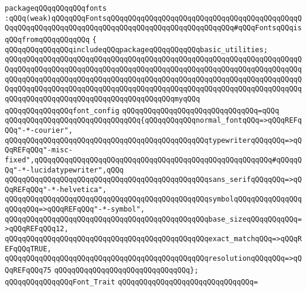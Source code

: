 \newline
\newline
\newline
\verb|packageqQQqqQQqqQQqfonts|\newline
\verb|:qQQq(weak)qQQqqQQqFontsqQQqqQQqqQQqqQQqqQQqqQQqqQQqqQQqqQQqqQQqqQQqqQQqqQQqqQQqqQQqqQQqqQQqqQQqqQQqqQQqqQQqqQQqqQQqqQQqqQQq#qQQqFontsqQQqisqQQqfromqQQqqQQqqQQq|\newline
\verb|{|\newline
\verb|qQQqqQQqqQQqqQQqincludeqQQqpackageqQQqqQQqqQQqbasic_utilities;|\newline
\verb|qQQqqQQqqQQqqQQqqQQqqQQqqQQqqQQqqQQqqQQqqQQqqQQqqQQqqQQqqQQqqQQqqQQqqQQqqQQqqQQqqQQqqQQqqQQqqQQqqQQqqQQqqQQqqQQqqQQqqQQqqQQqqQQqqQQqqQQqqQQqqQQqqQQqqQQqqQQqqQQqqQQqqQQqqQQqqQQqqQQqqQQqqQQqqQQqqQQqqQQqqQQqqQQqqQQqqQQqqQQqqQQqqQQqqQQqqQQqqQQqqQQqqQQqqQQqqQQqqQQqqQQqqQQqqQQqqQQqqQQqqQQqqQQqqQQqqQQqqQQqqQQqqQQqqQQqqQQqqQQqmyqQQq|\newline
\verb|qQQqqQQqqQQqqQQqfont_config|\newline
\verb|qQQqqQQqqQQqqQQqqQQqqQQqqQQqqQQq=qQQq|\newline
\verb|qQQqqQQqqQQqqQQqqQQqqQQqqQQqqQQq{qQQqqQQqqQQqnormal_fontqQQq=>qQQqREFqQQq"-*-courier",|\newline
\verb|qQQqqQQqqQQqqQQqqQQqqQQqqQQqqQQqqQQqqQQqqQQqqQQqtypewriterqQQqqQQq=>qQQqREFqQQq"-misc-fixed",qQQqqQQqqQQqqQQqqQQqqQQqqQQqqQQqqQQqqQQqqQQqqQQqqQQqqQQq#qQQqqQQq"-*-lucidatypewriter",qQQq|\newline
\verb|qQQqqQQqqQQqqQQqqQQqqQQqqQQqqQQqqQQqqQQqqQQqqQQqsans_serifqQQqqQQq=>qQQqREFqQQq"-*-helvetica",|\newline
\verb|qQQqqQQqqQQqqQQqqQQqqQQqqQQqqQQqqQQqqQQqqQQqqQQqsymbolqQQqqQQqqQQqqQQqqQQqqQQq=>qQQqREFqQQq"-*-symbol",|\newline
\verb|qQQqqQQqqQQqqQQqqQQqqQQqqQQqqQQqqQQqqQQqqQQqqQQqbase_sizeqQQqqQQqqQQq=>qQQqREFqQQq12,|\newline
\verb|qQQqqQQqqQQqqQQqqQQqqQQqqQQqqQQqqQQqqQQqqQQqqQQqexact_matchqQQq=>qQQqREFqQQqTRUE,|\newline
\verb|qQQqqQQqqQQqqQQqqQQqqQQqqQQqqQQqqQQqqQQqqQQqqQQqresolutionqQQqqQQq=>qQQqREFqQQq75|\newline
\verb|qQQqqQQqqQQqqQQqqQQqqQQqqQQqqQQq};|\newline
\newline
\verb|qQQqqQQqqQQqqQQqFont_Trait|\newline
\verb|qQQqqQQqqQQqqQQqqQQqqQQqqQQqqQQq=|\newline
